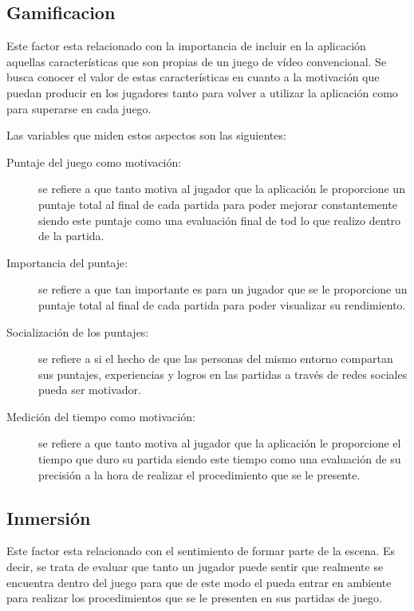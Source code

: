 \subsection{Gamificacion}

Este factor esta relacionado con la importancia de incluir en la aplicación
aquellas características que son propias de un juego de vídeo convencional. Se
busca conocer el valor de estas características en cuanto a la motivación que
puedan producir en los jugadores tanto para volver a utilizar la aplicación como
para superarse en cada juego.

Las variables que miden estos aspectos son las siguientes:

\begin{description}
   
\item[Puntaje del juego como motivación:] se refiere a que tanto motiva al
    jugador que la aplicación le proporcione un puntaje total al final de cada
    partida para poder mejorar constantemente siendo este puntaje como una
    evaluación final de tod lo que realizo dentro de la partida.

\item[Importancia del puntaje:] se refiere a que tan importante es para un
    jugador que se le proporcione un puntaje total al final de cada partida para
    poder visualizar su rendimiento.

\item[Socialización de los puntajes:] se refiere a si el hecho de que las
    personas del mismo entorno compartan sus puntajes, experiencias y logros en
    las partidas a través de redes sociales pueda ser motivador.

\item[Medición del tiempo como motivación:] se refiere a que tanto motiva al
    jugador que la aplicación le proporcione el tiempo que duro su partida
    siendo este tiempo como una evaluación de su precisión a la hora de realizar
    el procedimiento que se le presente.

\end{description} \subsection{Inmersión}

Este factor esta relacionado con el sentimiento de formar parte de la escena. Es
decir, se trata de evaluar que tanto un jugador puede sentir que realmente se
encuentra dentro del juego para que de este modo el pueda entrar en ambiente
para realizar los procedimientos que se le presenten en sus partidas de juego.

